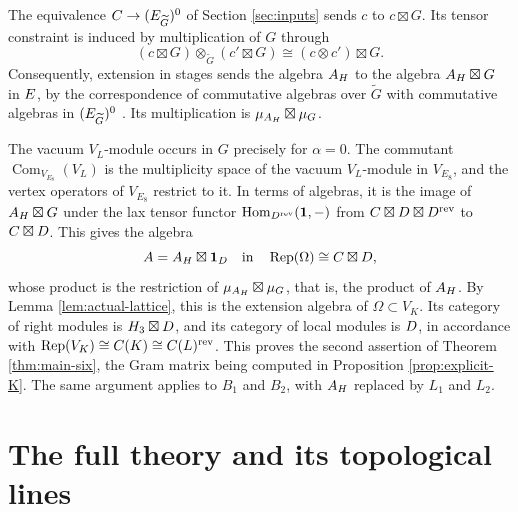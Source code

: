 \documentclass[leqno]{article}
\let\cal\relax
\newcommand{\cal}{\mathcal}
\newcommand{\ot}{\otimes}
\DeclareMathOperator{\Rep}{Rep}
\numberwithin{equation}{section}
\begin{document}
The equivalence $\cal C \to (\cal E_{\widetilde G})^0$ of Section \ref{sec:inputs} sends $c$ to $c \boxtimes G$. Its tensor constraint is induced by multiplication of $G$ through
\[
(c \boxtimes G) \ot_{\widetilde G} (c' \boxtimes G) \cong (c \ot c') \boxtimes G.
\]
Consequently, extension in stages sends the algebra $\cal A_{\cal H}$ to the algebra $\cal A_{\cal H} \boxtimes G$ in $\cal E$, by the correspondence of commutative algebras over $\widetilde G$ with commutative algebras in $(\cal E_{\widetilde G})^0$ \cite[Section 3.6 and Proposition 3.16 p.~12]{DMNO13}. Its multiplication is $\mu_{\cal A_{\cal H}} \boxtimes \mu_G$.

The vacuum $V_L$-module occurs in $G$ precisely for $\alpha = 0$. The commutant $\operatorname{Com}_{V_{E_8}}(V_L)$ is the multiplicity space of the vacuum $V_L$-module in $V_{E_8}$, and the vertex operators of $V_{E_8}$ restrict to it. In terms of algebras, it is the image of $\cal A_{\cal H} \boxtimes G$ under the lax tensor functor $\operatorname{Hom}_{\cal D^{\mathrm{rev}}}(\mathbf 1,-)$ from $\cal C \boxtimes \cal D \boxtimes \cal D^{\mathrm{rev}}$ to $\cal C \boxtimes \cal D$. This gives the algebra
\begin{equation}
\label{eq:extension-algebra}
A = \cal A_{\cal H} \boxtimes \mathbf 1_{\cal D}
\quad\text{in}\quad \Rep(\Omega) \cong \cal C \boxtimes \cal D,
\end{equation}
whose product is the restriction of $\mu_{\cal A_{\cal H}} \boxtimes \mu_G$, that is, the product of $\cal A_{\cal H}$. By Lemma \ref{lem:actual-lattice}, this is the extension algebra of $\Omega \subset V_K$. Its category of right modules is $\cal H_3 \boxtimes \cal D$, and its category of local modules is $\cal D$, in accordance with $\Rep(V_K) \cong \cal C(K) \cong \cal C(L)^{\mathrm{rev}}$. This proves the second assertion of Theorem \ref{thm:main-six}, the Gram matrix being computed in Proposition \ref{prop:explicit-K}. The same argument applies to $B_1$ and $B_2$, with $\cal A_{\cal H}$ replaced by $L_1$ and $L_2$.

\section{The full theory and its topological lines}
\label{sec:full}
\end{document}
